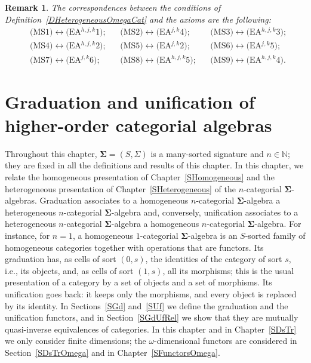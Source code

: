 \documentclass[a4paper, reqno]{amsbook}
\newcommand{\sig}[1]{\mathbf{#1}}             %
\theoremstyle{plain}
\newtheorem{remark}[theorem]{Remark}
\theoremstyle{definition}
\begin{document}
\begin{remark}
The correspondences between the conditions of Definition~\ref{DHeterogeneousOmegaCat} and the axioms are the following:
\begin{align*}
&\text{(MS1)}\leftrightarrow\text{(EA$^{h,j,k}$1)};
&&\text{(MS2)}\leftrightarrow\text{(EA$^{j,k}$4)};
&&\text{(MS3)}\leftrightarrow\text{(EA$^{h,j,k}$3)};
\\
&\text{(MS4)}\leftrightarrow\text{(EA$^{h,j,k}$2)};
&&\text{(MS5)}\leftrightarrow\text{(EA$^{j,k}$2)};
&&\text{(MS6)}\leftrightarrow\text{(EA$^{j,k}$5)};
\\
&\text{(MS7)}\leftrightarrow\text{(EA$^{j,k}$6)};
&&\text{(MS8)}\leftrightarrow\text{(EA$^{h,j,k}$5)};
&&\text{(MS9)}\leftrightarrow\text{(EA$^{h,j,k}$4)}.
\end{align*}
\end{remark}

\chapter[Graduation and unification]{Graduation and unification of higher-order categorial algebras}\label{SGdUf}

Throughout this chapter, $\sig{\Sigma}=(S,\Sigma)$ is a many-sorted signature and $n\in\mathbb{N}$; they are fixed in all the definitions and results of this chapter.
In this chapter, we relate the homogeneous presentation of Chapter~\ref{SHomogeneous} and the heterogeneous presentation of Chapter~\ref{SHeterogeneous} of the $n$-categorial $\sig{\Sigma}$-algebras.
Graduation associates to a homogeneous $n$-categorial $\sig{\Sigma}$-algebra a heterogeneous $n$-categorial $\sig{\Sigma}$-algebra and, conversely, unification associates to a heterogeneous $n$-categorial $\sig{\Sigma}$-algebra a homogeneous $n$-categorial $\sig{\Sigma}$-algebra.
For instance, for $n=1$, a homogeneous $1$-categorial $\sig{\Sigma}$-algebra is an $S$-sorted family of homogeneous categories together with operations that are functors.
Its graduation has, as cells of sort $(0,s)$, the identities of the category of sort $s$, i.e., its objects, and, as cells of sort $(1,s)$, all its morphisms; this is the usual presentation of a category by a set of objects and a set of morphisms.
Its unification goes back: it keeps only the morphisms, and every object is replaced by its identity.
In Sections~\ref{SGd} and~\ref{SUf} we define the graduation and the unification functors, and in Section~\ref{SGdUfRel} we show that they are mutually quasi-inverse equivalences of categories.
In this chapter and in Chapter~\ref{SDsTr} we only consider finite dimensions; the $\omega$-dimensional functors are considered in Section~\ref{SDsTrOmega} and in Chapter~\ref{SFunctorsOmega}.
\end{document}
